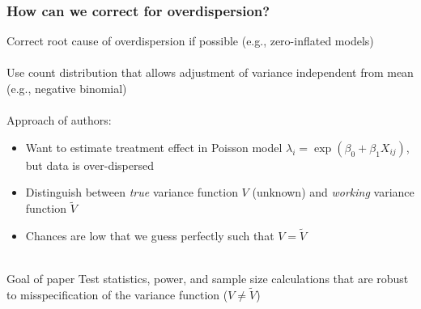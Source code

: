 \documentclass{beamer}
\begin{document}
\begin{frame}
	\frametitle{How can we correct for overdispersion?}
	 Correct root cause of overdispersion if possible (e.g.,
	zero-inflated models) \\~\\

	Use count distribution that allows adjustment of variance
	independent from mean (e.g., negative binomial) \\~\\

	Approach of authors:
	\begin{itemize}
		\item \small Want to estimate treatment effect in Poisson model
			$\lambda_i = \exp{(\beta_0 + \beta_1 X_{ij})}$, but data
			is over-dispersed
		\item \small Distinguish between \textit{true} variance function
			$V$ (unknown) and \textit{working} variance
			function $\tilde{V}$
		\item \small Chances are low that we guess perfectly such that
			$V=\tilde{V}$ 
			\\~\\
	\end{itemize}

	\begin{block}{Goal of paper}
		Test statistics, power, and sample size
		calculations that are robust to misspecification of the
		variance function ($V\neq \tilde{V}$)
	\end{block}
\end{frame}
\end{document}

